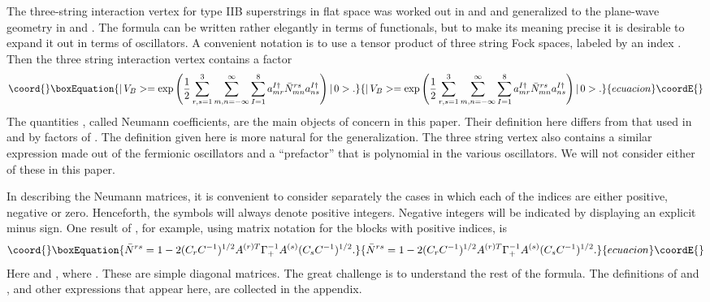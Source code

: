 \documentclass[a4paper,12pt]{article}
\begin{document}
The three-string interaction vertex for type IIB superstrings in
flat space was worked out in \cite{Green:1982tc} and
\cite{Green:hw} and generalized to the plane-wave geometry in
\cite{Spradlin:2002ar} and \cite{Spradlin:2002rv}. The formula can
be written rather elegantly in terms of functionals, but to make
its meaning precise it is desirable to expand it out in terms of
oscillators. A convenient notation is to use a tensor product of
three string Fock spaces, labeled by an index \coordHE{}. Then the
three string interaction vertex contains a factor
\begin{equation}\coord{}\boxEquation{
|\, V_B> = {\rm exp} \left( {1\over 2} \sum_{r,s =1}^3 \sum_{m,n
=-\infty}^{\infty} \sum_{I=1}^8 a_{mr}^{I\dagger} \bar N_{mn}^{rs}
a_{ns}^{I\dagger}\right) |\, 0>.
}{
|\, V_B> = {\rm exp} \left( {1\over 2} \sum_{r,s =1}^3 \sum_{m,n
=-\infty}^{\infty} \sum_{I=1}^8 a_{mr}^{I\dagger} \bar N_{mn}^{rs}
a_{ns}^{I\dagger}\right) |\, 0>.
}{ecuacion}\coordE{}\end{equation}
The quantities \coordHE{}, called Neumann coefficients,
are the main objects of concern in this paper. Their definition
here differs from that used in \cite{Green:1982tc} and
\cite{Green:hw} by factors of \coordHE{}. The definition given
here is more natural for the \coordHE{} generalization. The three
string vertex also contains a similar expression \coordHE{} made
out of the fermionic oscillators and a ``prefactor'' that is
polynomial in the various oscillators. We will not consider either
of these in this paper.

In describing the Neumann matrices, it is convenient to consider
separately the cases in which each of the indices \coordHE{} are either
positive, negative or zero. Henceforth, the symbols \coordHE{} will
always denote positive integers. Negative integers will be
indicated by displaying an explicit minus sign.  One result of
\cite{Spradlin:2002ar}, for example, using matrix notation for the
blocks with positive indices, is
\begin{equation}\coord{}\boxEquation{
\bar N^{rs} = 1 - 2 (C_r C^{-1})^{1/2} A^{(r)T}
\Gamma_+^{-1}A^{(s)} (C_s C^{-1})^{1/2}.
}{
\bar N^{rs} = 1 - 2 (C_r C^{-1})^{1/2} A^{(r)T}
\Gamma_+^{-1}A^{(s)} (C_s C^{-1})^{1/2}.
}{ecuacion}\coordE{}\end{equation}
Here \coordHE{} and \coordHE{}, where \coordHE{}. These are simple diagonal matrices. The great
challenge is to understand the rest of the formula. The
definitions of \coordHE{} and \myHighlight{$\Gamma_+$}\coordHE{}, and other expressions
that appear here, are collected in the appendix.
\end{document}
